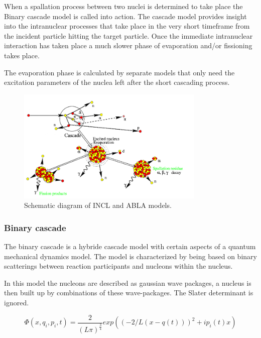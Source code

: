 When a spallation process between two nuclei is determined to take place the Binary cascade model is called into action. The cascade model provides insight into the intranuclear processes that take place in the very short timeframe from the incident particle hitting the target particle. Once the immediate intranuclear interaction has taken place a much slower phase of evaporation and/or fissioning takes place. 

The evaporation phase is calculated by separate models that only need the excitation parameters of the nuclea left after the short cascading process.

\begin{figure} 
\begin{center}
\includegraphics[width=0.8\textwidth]{images/inclScematic.png}  
\caption{\label{fig:inclschematic} Schematic diagram of INCL and ABLA models.}
 
 \end{center}
 \end{figure}

\subsubsection{Binary cascade}
The binary cascade is a hybride cascade model with certain aspects of a quantum mechanical dynamics model. The model is characterized by being based on binary scatterings between reaction participants and nucleons within the nucleus.

In this model the nucleons are described as gaussian wave packages, a nucleus is then built up by combinations of these wave-packages. The Slater determinant is ignored.


\begin{equation}
\Phi(x,q_i,p_i,t) = \frac{2}{(L\pi)^{\frac{3}{4}}}exp((-2/L(x -q(t)))^2+ip_i(t)x)
\label{wavePackage}
\end{equation}


